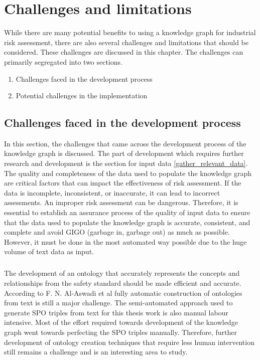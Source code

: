 \chapter{Challenges and limitations} \label{challenges}

\bigskip \bigskip 

While there are many potential benefits to using a knowledge graph for industrial risk assessment, there are also several challenges and limitations that should be considered. These challenges are discussed in this chapter. The challenges can primarily segregated into two sections.
\begin{enumerate}
    \item Challenges faced in the development process
    \item Potential challenges in the implementation
\end{enumerate}

\section{Challenges faced in the development process}

In this section, the challenges that came across the development process of the knowledge graph is discussed. The part of development which requires further research and development is the section for input data \ref{gather_relevant_data}. The quality and completeness of the data used to populate the knowledge graph are critical factors that can impact the effectiveness of risk assessment. If the data is incomplete, inconsistent, or inaccurate, it can lead to incorrect assessments. An improper risk assessment can be dangerous. Therefore, it is essential to establish an assurance process of the quality of input data to ensure that the data used to populate the knowledge graph is accurate, consistent, and complete and avoid GIGO (garbage in, garbage out) as much as possible. However, it must be done in the most automated way possible due to the huge volume of text data as input. 

\paragraph{} The development of an ontology that accurately represents the concepts and relationships from the safety standard should be made efficient and accurate. According to F. N. Al-Aswadi et al \cite{al-aswadi_chan_gan_2019} fully automatic construction of ontologies from text is still a major challenge. The semi-automated approach used to generate SPO triples from text for this thesis work is also manual labour intensive. Most of the effort required towards development of the knowledge graph went towards perfecting the SPO triples manually. Therefore, further development of ontology creation techniques that require less human intervention still remains a challenge and is an interesting area to study.

